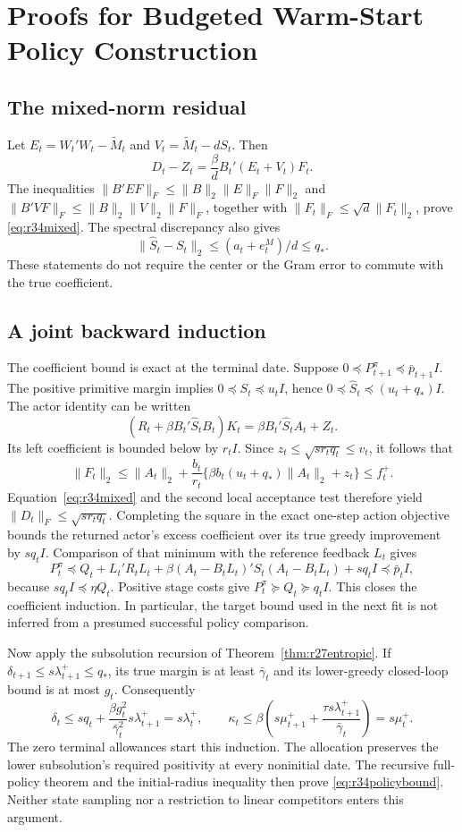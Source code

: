 \section{Proofs for Budgeted Warm-Start Policy Construction}
\label{sec:r34proof}
\subsection{The mixed-norm residual}
Let $E_t=W_t'W_t-\widetilde M_t$ and
$V_t=\widetilde M_t-dS_t$. Then
\[
 D_t-Z_t=\frac{\beta}{d}B_t'(E_t+V_t)F_t.
\]
The inequalities $\|B'EF\|_F\leq\|B\|_2\|E\|_F\|F\|_2$ and
$\|B'VF\|_F\leq\|B\|_2\|V\|_2\|F\|_F$, together with
$\|F_t\|_F\leq\sqrt d\|F_t\|_2$, prove \eqref{eq:r34mixed}.
The spectral discrepancy also gives
\[
 \|\widehat S_t-S_t\|_2\leq(a_t+e_t^M)/d\leq q_*.
\]
These statements do not require the center or the Gram error to commute
with the true coefficient.

\subsection{A joint backward induction}
The coefficient bound is exact at the terminal date. Suppose
$0\preceq P_{t+1}^\pi\preceq\bar p_{t+1}I$. The positive primitive margin
implies $0\preceq S_t\preceq u_tI$, hence
$0\preceq\widehat S_t\preceq(u_t+q_*)I$. The actor identity can be written
\[
 (R_t+\beta B_t'\widehat S_tB_t)K_t
                      =\beta B_t'\widehat S_tA_t+Z_t.
\]
Its left coefficient is bounded below by $r_tI$. Since
$z_t\leq\sqrt{s r_tq_t}\leq v_t$, it follows that
\[
 \|F_t\|_2\leq\|A_t\|_2+
    \frac{b_t}{r_t}\{\beta b_t(u_t+q_*)\|A_t\|_2+z_t\}
       \leq f_t^+.
\]
Equation~\eqref{eq:r34mixed} and the second local acceptance test therefore
yield $\|D_t\|_F\leq\sqrt{s r_tq_t}$. Completing the square in the exact
one-step action objective bounds the returned actor's excess coefficient
over its true greedy improvement by $s q_t I$. Comparison of that minimum
with the reference feedback $L_t$ gives
\[
 P_t^\pi\preceq Q_t+L_t'R_tL_t+
 \beta(A_t-B_tL_t)'S_t(A_t-B_tL_t)+s q_tI\preceq\bar p_tI,
\]
because $s q_tI\preceq\eta Q_t$. Positive stage costs give
$P_t^\pi\succeq Q_t\succeq q_tI$. This closes the coefficient induction.
In particular, the target bound used in the next fit is not inferred from
a presumed successful policy comparison.

Now apply the subsolution recursion of
Theorem~\ref{thm:r27entropic}. If
$\delta_{t+1}\leq s\lambda_{t+1}^+\leq q_*$, its true margin is at least
$\bar\gamma_t$ and its lower-greedy closed-loop bound is at most $g_t$.
Consequently
\[
 \delta_t\leq s q_t+
       \frac{\beta g_t^2}{\bar\gamma_t^2}s\lambda_{t+1}^+
           =s\lambda_t^+,
 \qquad
 \kappa_t\leq\beta\left(s\mu_{t+1}^+
       +\frac{\tau s\lambda_{t+1}^+}{\bar\gamma_t}\right)=s\mu_t^+.
\]
The zero terminal allowances start this induction. The allocation preserves
the lower subsolution's required positivity at every noninitial date.
The recursive full-policy theorem and the initial-radius inequality then
prove \eqref{eq:r34policybound}. Neither state sampling nor a restriction to
linear competitors enters this argument.

